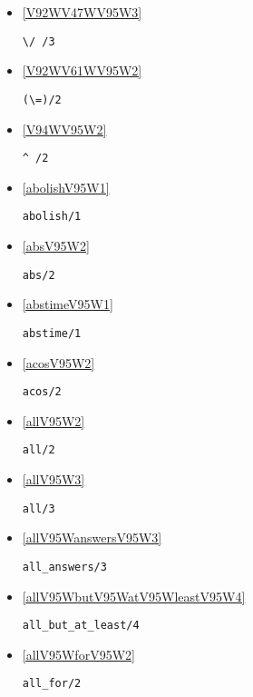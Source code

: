 \begin{itemize}
\item \ref{V92WV47WV95W3} 
\begin{verbatim}
\/ /3
\end{verbatim}

\item \ref{V92WV61WV95W2} 
\begin{verbatim}
(\=)/2
\end{verbatim}

\item \ref{V94WV95W2} 
\begin{verbatim}
^ /2
\end{verbatim}

\item \ref{abolishV95W1} 
\begin{verbatim}
abolish/1
\end{verbatim}

\item \ref{absV95W2} 
\begin{verbatim}
abs/2
\end{verbatim}

\item \ref{abstimeV95W1} 
\begin{verbatim}
abstime/1
\end{verbatim}

\item \ref{acosV95W2} 
\begin{verbatim}
acos/2
\end{verbatim}

\item \ref{allV95W2} 
\begin{verbatim}
all/2
\end{verbatim}

\item \ref{allV95W3} 
\begin{verbatim}
all/3
\end{verbatim}

\item \ref{allV95WanswersV95W3} 
\begin{verbatim}
all_answers/3
\end{verbatim}

\item \ref{allV95WbutV95WatV95WleastV95W4} 
\begin{verbatim}
all_but_at_least/4
\end{verbatim}

\item \ref{allV95WforV95W2} 
\begin{verbatim}
all_for/2
\end{verbatim}


\end{itemize}
